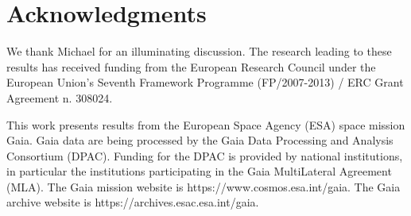 \documentclass[a4paper,useAMS,usenatbib]{mnras}
\begin{document}
\section*{Acknowledgments}

We thank Michael for an illuminating discussion. The research leading
to these results has received funding from the European Research
Council under the European Union's Seventh Framework Programme
(FP/2007-2013) / ERC Grant Agreement n. 308024.

This work presents results from the European Space Agency (ESA) space
mission Gaia. Gaia data are being processed by the Gaia Data
Processing and Analysis Consortium (DPAC). Funding for the DPAC is
provided by national institutions, in particular the institutions
participating in the Gaia MultiLateral Agreement (MLA). The Gaia
mission website is https://www.cosmos.esa.int/gaia. The Gaia archive
website is https://archives.esac.esa.int/gaia.




\label{lastpage}
\end{document}
